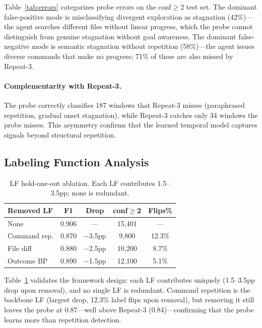 \documentclass[11pt]{article}
\begin{document}
Table~\ref{tab:errors} categorizes probe errors on the conf$\geq$2 test set. The dominant false-positive mode is misclassifying divergent exploration as stagnation (42\%)---the agent searches different files without linear progress, which the probe cannot distinguish from genuine stagnation without goal awareness. The dominant false-negative mode is semantic stagnation without repetition (58\%)---the agent issues diverse commands that make no progress; 71\% of these are also missed by Repeat-3.

\paragraph{Complementarity with Repeat-3.}
The probe correctly classifies 187 windows that Repeat-3 misses (paraphrased repetition, gradual onset stagnation), while Repeat-3 catches only 34 windows the probe misses. This asymmetry confirms that the learned temporal model captures signals beyond structural repetition.

\subsection{Labeling Function Analysis}

\begin{table}[t]
\centering
\small
\begin{tabular}{lcccc}
\toprule
\textbf{Removed LF} & \textbf{F1} & \textbf{Drop} & \textbf{conf$\geq$2} & \textbf{Flips\%} \\
\midrule
None & 0.906 & --- & 15,401 & --- \\
Command rep. & 0.870 & $-$3.5pp & 9,800 & 12.3\% \\
File diff & 0.880 & $-$2.5pp & 10,200 & 8.7\% \\
Outcome BP & 0.890 & $-$1.5pp & 12,100 & 5.1\% \\
\bottomrule
\end{tabular}
\caption{LF hold-one-out ablation. Each LF contributes 1.5--3.5pp; none is redundant.}
\label{tab:lf_ablation}
\end{table}

Table~\ref{tab:lf_ablation} validates the framework design: each LF contributes uniquely (1.5--3.5pp drop upon removal), and no single LF is redundant. Command repetition is the backbone LF (largest drop, 12.3\% label flips upon removal), but removing it still leaves the probe at 0.87---well above Repeat-3 (0.84)---confirming that the probe learns more than repetition detection.
\end{document}
